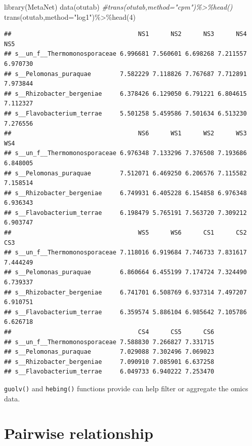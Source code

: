 \documentclass[
]{book}
\newenvironment{Shaded}{\begin{snugshade}}{\end{snugshade}}
\newcommand{\AttributeTok}[1]{\textcolor[rgb]{0.77,0.63,0.00}{#1}}
\newcommand{\CommentTok}[1]{\textcolor[rgb]{0.56,0.35,0.01}{\textit{#1}}}
\newcommand{\DecValTok}[1]{\textcolor[rgb]{0.00,0.00,0.81}{#1}}
\newcommand{\FunctionTok}[1]{\textcolor[rgb]{0.00,0.00,0.00}{#1}}
\newcommand{\NormalTok}[1]{#1}
\newcommand{\SpecialCharTok}[1]{\textcolor[rgb]{0.00,0.00,0.00}{#1}}
\newcommand{\StringTok}[1]{\textcolor[rgb]{0.31,0.60,0.02}{#1}}
\begin{document}
\begin{Shaded}
\begin{Highlighting}[]
\FunctionTok{library}\NormalTok{(MetaNet)}
\FunctionTok{data}\NormalTok{(otutab)}
\CommentTok{\#trans(otutab,method="cpm")\%\textgreater{}\%head()}
\FunctionTok{trans}\NormalTok{(otutab,}\AttributeTok{method=}\StringTok{"log1"}\NormalTok{)}\SpecialCharTok{\%\textgreater{}\%}\FunctionTok{head}\NormalTok{(}\DecValTok{4}\NormalTok{)}
\end{Highlighting}
\end{Shaded}

\begin{verbatim}
##                                   NS1      NS2      NS3      NS4      NS5
## s__un_f__Thermomonosporaceae 6.996681 7.560601 6.698268 7.211557 6.970730
## s__Pelomonas_puraquae        7.582229 7.118826 7.767687 7.712891 7.973844
## s__Rhizobacter_bergeniae     6.378426 6.129050 6.791221 6.804615 7.112327
## s__Flavobacterium_terrae     5.501258 5.459586 7.501634 6.513230 7.276556
##                                   NS6      WS1      WS2      WS3      WS4
## s__un_f__Thermomonosporaceae 6.976348 7.133296 7.376508 7.193686 6.848005
## s__Pelomonas_puraquae        7.512071 6.469250 6.206576 7.115582 7.158514
## s__Rhizobacter_bergeniae     6.749931 6.405228 6.154858 6.976348 6.936343
## s__Flavobacterium_terrae     6.198479 5.765191 7.563720 7.309212 6.903747
##                                   WS5      WS6      CS1      CS2      CS3
## s__un_f__Thermomonosporaceae 7.118016 6.919684 7.746733 7.831617 7.444249
## s__Pelomonas_puraquae        6.860664 6.455199 7.174724 7.324490 6.739337
## s__Rhizobacter_bergeniae     6.741701 6.508769 6.937314 7.497207 6.910751
## s__Flavobacterium_terrae     6.359574 5.886104 6.985642 7.105786 6.626718
##                                   CS4      CS5      CS6
## s__un_f__Thermomonosporaceae 7.588830 7.266827 7.331715
## s__Pelomonas_puraquae        7.029088 7.302496 7.069023
## s__Rhizobacter_bergeniae     7.090910 7.085901 6.637258
## s__Flavobacterium_terrae     6.049733 6.940222 7.253470
\end{verbatim}

\texttt{guolv()} and \texttt{hebing()} functions provide can help filter or aggregate the omics data.

\hypertarget{pairwise-relationship}{%
\section{Pairwise relationship}\label{pairwise-relationship}}
\end{document}
